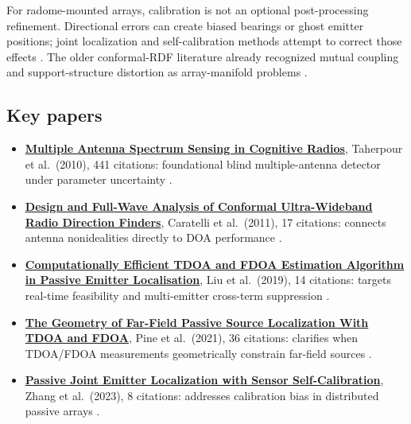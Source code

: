 \documentclass[
  10pt,
]{article}
\providecommand{\tightlist}{%
  \setlength{\itemsep}{0pt}\setlength{\parskip}{0pt}}
\begin{document}
For radome-mounted arrays, calibration is not an optional
post-processing refinement. Directional errors can create biased
bearings or ghost emitter positions; joint localization and
self-calibration methods attempt to correct those effects
\citep{zhang2023calibration}. The older conformal-RDF literature already
recognized mutual coupling and support-structure distortion as
array-manifold problems \citep{caratelli2011, liberal2011}.

\subsection{Key papers}\label{key-papers-2}

\begin{itemize}
\tightlist
\item
  \href{https://consensus.app/papers/details/dd361298468d58a9a3f6b6af0c34e977/?utm_source=chatgpt}{\textbf{Multiple
  Antenna Spectrum Sensing in Cognitive Radios}}, Taherpour et
  al.~(2010), 441 citations: foundational blind multiple-antenna
  detector under parameter uncertainty \citep{taherpour2010}.
\item
  \href{https://consensus.app/papers/details/5f166a5e2c715f25a2cfa7d55f20749f/?utm_source=chatgpt}{\textbf{Design
  and Full-Wave Analysis of Conformal Ultra-Wideband Radio Direction
  Finders}}, Caratelli et al.~(2011), 17 citations: connects antenna
  nonidealities directly to DOA performance \citep{caratelli2011}.
\item
  \href{https://consensus.app/papers/details/47ae35140d8e563486d4808c6acd8485/?utm_source=chatgpt}{\textbf{Computationally
  Efficient TDOA and FDOA Estimation Algorithm in Passive Emitter
  Localisation}}, Liu et al.~(2019), 14 citations: targets real-time
  feasibility and multi-emitter cross-term suppression \citep{liu2019}.
\item
  \href{https://consensus.app/papers/details/035e2d1ded6e5316b49b04c2007445cb/?utm_source=chatgpt}{\textbf{The
  Geometry of Far-Field Passive Source Localization With TDOA and
  FDOA}}, Pine et al.~(2021), 36 citations: clarifies when TDOA/FDOA
  measurements geometrically constrain far-field sources
  \citep{pine2021}.
\item
  \href{https://consensus.app/papers/details/a785d6a4988c51bcb3d4c3b896010b09/?utm_source=chatgpt}{\textbf{Passive
  Joint Emitter Localization with Sensor Self-Calibration}}, Zhang et
  al.~(2023), 8 citations: addresses calibration bias in distributed
  passive arrays \citep{zhang2023calibration}.
\end{itemize}
\end{document}
